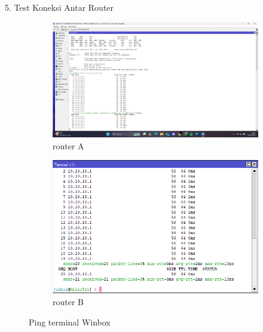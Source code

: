 5. Test Koneksi Antar Router
\begin{figure}[H]
    \centering
    \begin{subfigure}[b]{0.3\linewidth}
      \centering
      \includegraphics[width=\linewidth]{image/station3.jpg}
      \caption{router A}
    \end{subfigure}
    \hspace{1cm}
    \begin{subfigure}[b]{0.3\linewidth}
      \centering
      \includegraphics[width=\linewidth]{image/station1.png}
      \caption{router B}
    \end{subfigure}
    \caption{Ping terminal Winbox}
\end{figure}

